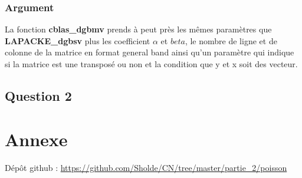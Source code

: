 \documentclass[11pt]{article}
\begin{document}
\subsubsection{Argument}

La fonction \textbf{cblas\_dgbmv} prends à peut près les mêmes
paramètres que \textbf{LAPACKE\_dgbsv} plus les coefficient $\alpha$
et $beta$, le nombre de ligne et de colonne de la matrice en format
general band ainsi qu'un paramètre qui indique si la matrice est une
transposé ou non et la condition que y et x soit des vecteur.

\subsection{Question 2}

\section{Annexe}

Dépôt github : \url{https://github.com/Sholde/CN/tree/master/partie_2/poisson}
\end{document}
